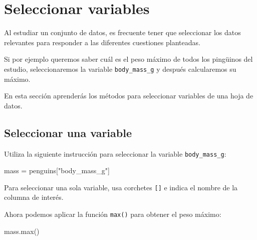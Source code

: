 \documentclass[
  a4paper,
  noprof,
  12pt,
  notoc,
  nosols,
  nobib]{mnye}
\newenvironment{Shaded}{\begin{snugshade}}{\end{snugshade}}
\newcommand{\BuiltInTok}[1]{\textcolor[rgb]{0.00,0.23,0.31}{#1}}
\newcommand{\NormalTok}[1]{\textcolor[rgb]{0.00,0.23,0.31}{#1}}
\newcommand{\OperatorTok}[1]{\textcolor[rgb]{0.37,0.37,0.37}{#1}}
\newcommand{\StringTok}[1]{\textcolor[rgb]{0.13,0.47,0.30}{#1}}
\theoremstyle{definition}
\theoremstyle{remark}
\begin{document}
\section{Seleccionar variables}\label{sec-subset-variables}

Al estudiar un conjunto de datos, es frecuente tener que seleccionar los
datos relevantes para responder a las diferentes cuestiones planteadas.

Si por ejemplo queremos saber cuál es el peso máximo de todos los
pingüinos del estudio, seleccionaremos la variable
\texttt{body\_mass\_g} y después calcularemos su máximo.

En esta sección aprenderás los métodos para seleccionar variables de una
hoja de datos.

\subsection{Seleccionar una variable}\label{sec-subset-one-variable}

Utiliza la siguiente instrucción para seleccionar la variable
\texttt{body\_mass\_g}:

\begin{Shaded}
\begin{Highlighting}[]
\NormalTok{mass }\OperatorTok{=}\NormalTok{ penguins[}\StringTok{"body\_mass\_g"}\NormalTok{]}
\end{Highlighting}
\end{Shaded}

\begin{tcolorbox}[enhanced jigsaw, opacityback=0, leftrule=.75mm, left=2mm, arc=.35mm, rightrule=.15mm, colframe=quarto-callout-note-color-frame, bottomrule=.15mm, colback=white, breakable, toprule=.15mm]
\begin{minipage}[t]{5.5mm}
\textcolor{quarto-callout-note-color}{\faInfo}
\end{minipage}%
\begin{minipage}[t]{\textwidth - 5.5mm}

Para seleccionar una sola variable, usa corchetes \texttt{{[}{]}} e
indica el nombre de la columna de interés.

\end{minipage}%
\end{tcolorbox}

Ahora podemos aplicar la función \texttt{max()} para obtener el peso
máximo:

\begin{Shaded}
\begin{Highlighting}[]
\NormalTok{mass.}\BuiltInTok{max}\NormalTok{()}
\end{Highlighting}
\end{Shaded}
\end{document}

